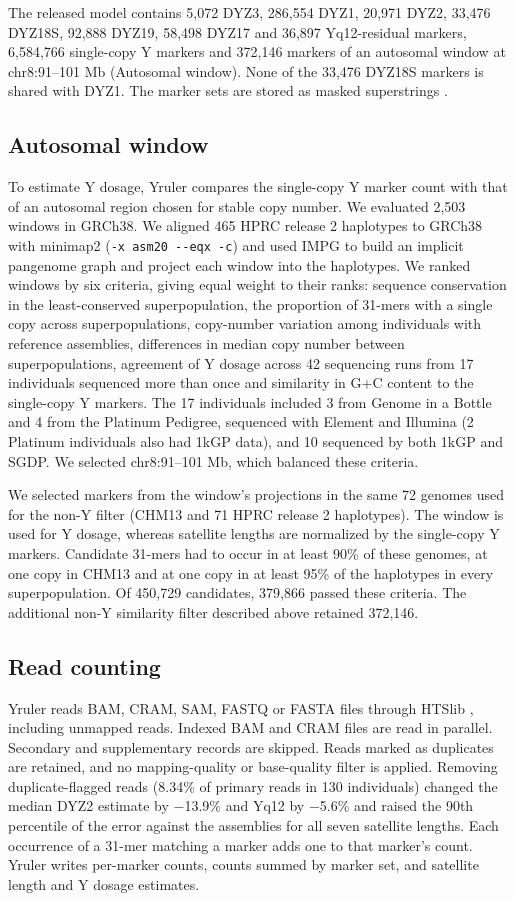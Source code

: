 The released model contains 5,072 DYZ3, 286,554 DYZ1, 20,971 DYZ2, 33,476 DYZ18S, 92,888 DYZ19, 58,498 DYZ17 and 36,897 Yq12-residual markers, 6,584,766 single-copy Y markers and 372,146 markers of an autosomal window at chr8:91--101 Mb (Autosomal window). None of the 33,476 DYZ18S markers is shared with DYZ1. The marker sets are stored as masked superstrings \cite{Sladky2023}.

\subsection{Autosomal window}\label{sec:m-window}
To estimate Y dosage, Yruler compares the single-copy Y marker count with that of an autosomal region chosen for stable copy number. We evaluated 2,503 windows in GRCh38. We aligned 465 HPRC release 2 haplotypes to GRCh38 with minimap2 (\texttt{-x asm20 -{}-eqx -c}) \cite{Li2018} and used IMPG \cite{IMPG} to build an implicit pangenome graph and project each window into the haplotypes. We ranked windows by six criteria, giving equal weight to their ranks: sequence conservation in the least-conserved superpopulation, the proportion of 31-mers with a single copy across superpopulations, copy-number variation among individuals with reference assemblies, differences in median copy number between superpopulations, agreement of Y dosage across 42 sequencing runs from 17 individuals sequenced more than once and similarity in G+C content to the single-copy Y markers. The 17 individuals included 3 from Genome in a Bottle and 4 from the Platinum Pedigree, sequenced with Element and Illumina (2 Platinum individuals also had 1kGP data), and 10 sequenced by both 1kGP and SGDP. We selected chr8:91--101 Mb, which balanced these criteria.

We selected markers from the window's projections in the same 72 genomes used for the non-Y filter (CHM13 and 71 HPRC release 2 haplotypes). The window is used for Y dosage, whereas satellite lengths are normalized by the single-copy Y markers. Candidate 31-mers had to occur in at least 90\% of these genomes, at one copy in CHM13 and at one copy in at least 95\% of the haplotypes in every superpopulation. Of 450,729 candidates, 379,866 passed these criteria. The additional non-Y similarity filter described above retained 372,146.

\subsection{Read counting}\label{sec:m-counting}
Yruler reads BAM, CRAM, SAM, FASTQ or FASTA files through HTSlib \cite{Bonfield2021}, including unmapped reads. Indexed BAM and CRAM files are read in parallel. Secondary and supplementary records are skipped. Reads marked as duplicates are retained, and no mapping-quality or base-quality filter is applied. Removing duplicate-flagged reads (8.34\% of primary reads in 130 individuals) changed the median DYZ2 estimate by $-$13.9\% and Yq12 by $-$5.6\% and raised the 90th percentile of the error against the assemblies for all seven satellite lengths. Each occurrence of a 31-mer matching a marker adds one to that marker's count. Yruler writes per-marker counts, counts summed by marker set, and satellite length and Y dosage estimates.

